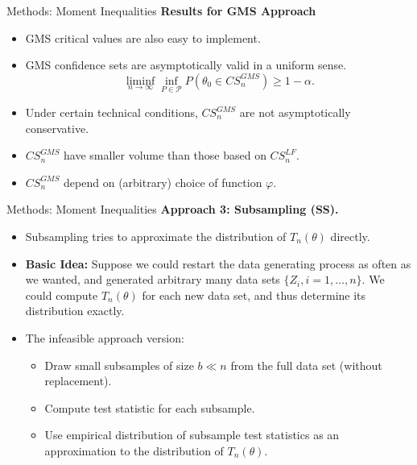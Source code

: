 \documentclass[aspectratio=169]{beamer}  %
\begin{document}
\begin{frame}{Methods: Moment Inequalities}
    \textbf{Results for GMS Approach} 
    \begin{itemize}
        \item GMS critical values are also easy to implement.
        \item GMS confidence sets are asymptotically valid in a uniform sense.
        $$\liminf_{n\to\infty}\inf_{P\in\mathscr{P}}P(\theta_0\in CS_n^{GMS})\geq1-\alpha.$$
        \item Under certain technical conditions,  $CS^{GMS}_n$ are not asymptotically conservative.
        \item $CS^{GMS}_n$ have smaller volume than those based on $CS^{LF}_n$.
        \item $CS^{GMS}_n$ depend on (arbitrary) choice of function $\varphi$.
    \end{itemize}
\end{frame}

\begin{frame}{Methods: Moment Inequalities}
    \textbf{Approach 3: Subsampling (SS).}
    \begin{itemize}
        \item Subsampling tries to approximate the distribution of $T_n(\theta)$ directly.
        \item \textbf{Basic Idea:} Suppose we could restart the data generating process as often
        as we wanted, and generated arbitrary many data sets $\{Z_i,i=1,\ldots,n\}$. We could compute $T_n(\theta)$ for each new data set, and thus determine its distribution exactly.
        \item The infeasible approach version:
        \begin{itemize}
            \item Draw small subsamples of size $b\ll n$ from the full data set (without
            replacement).
            \item Compute test statistic for each subsample.
            \item Use empirical distribution of subsample test statistics as an
            approximation to the distribution of $T_n(\theta)$.
            \end{itemize}
    \end{itemize}
\end{frame}
\end{document}
